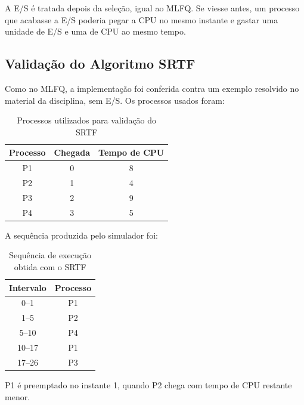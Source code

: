 \documentclass[12pt,a4paper]{article}
\begin{document}
A E/S é tratada depois da seleção, igual ao MLFQ. Se viesse antes, um
processo que acabasse a E/S poderia pegar a CPU no mesmo instante e
gastar uma unidade de E/S e uma de CPU ao mesmo tempo.



\subsection{Validação do Algoritmo SRTF}
\label{sec:validacaosrtf}

Como no MLFQ, a implementação foi conferida contra um exemplo
resolvido no material da disciplina, sem E/S. Os processos usados
foram:

\begin{table}[H]
    \centering
    \caption{Processos utilizados para validação do SRTF}
    \begin{tabular}{ccc}
        \toprule
        \textbf{Processo} &
        \textbf{Chegada} &
        \textbf{Tempo de CPU} \\
        \midrule
        P1 & 0 & 8 \\
        P2 & 1 & 4 \\
        P3 & 2 & 9 \\
        P4 & 3 & 5 \\
        \bottomrule
    \end{tabular}
\end{table}

A sequência produzida pelo simulador foi:

\begin{table}[H]
    \centering
    \caption{Sequência de execução obtida com o SRTF}
    \begin{tabular}{cc}
        \toprule
        \textbf{Intervalo} &
        \textbf{Processo} \\
        \midrule
        0--1   & P1 \\
        1--5   & P2 \\
        5--10  & P4 \\
        10--17 & P1 \\
        17--26 & P3 \\
        \bottomrule
    \end{tabular}
\end{table}

P1 é preemptado no instante 1, quando P2 chega com tempo de CPU
restante menor.
\end{document}

